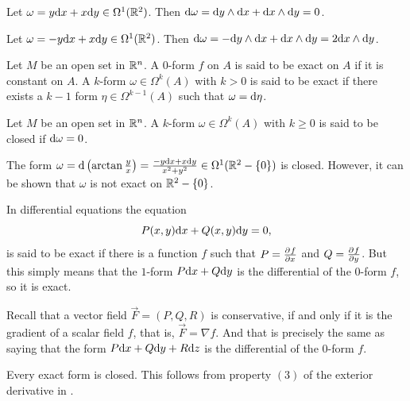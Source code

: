 \documentclass[11pt,a4paper]{article}
\begin{document}
\begin{example}
  Let $\omega = y \dx + x \dy \in \Omega^1(\R^2)$.
  Then $\dif \omega = \dy \wedge \dx + \dx \wedge \dy = 0$.
\end{example}

\begin{example}
  Let $\omega = -y \dx + x \dy \in \Omega^1(\R^2)$.
  Then $\dif \omega = -\dy \wedge \dx + \dx \wedge \dy = 2 \dx \wedge \dy$.
\end{example}

\begin{definition}
  Let $M$ be an open set in $\mathbb{R}^n$.
  A $0$-form $f$ on $A$ is said to be exact on $A$ if it is constant on $A$.
  A $k$-form $\omega \in \Omega^k(A)$ with $k > 0$
  is said to be exact if there exists a $k-1$ form $\eta \in \Omega^{k-1}(A)$
  such that $\omega = \mathrm{d} \eta$.
\end{definition}

\begin{definition}
  Let $M$ be an open set in $\mathbb{R}^n$.
  A $k$-form $\omega \in \Omega^k(A)$ with $k \geq 0$
  is said to be closed if $\mathrm{d} \omega = 0$.
\end{definition}

\begin{remark}
  The form $\omega = \dif \del{\arctan \frac{y}{x}} = \frac{-y \dx + x \dy}{x^2 + y^2} \in \Omega^1(\R^2 - \set{0})$ is closed.
  However, it can be shown that $\omega$ is not exact on $\mathbb{R}^2 - \left\{0\right\}$.
\end{remark}

\begin{example}
  In differential equations the equation
  \[
    P(x,y) \dx + Q(x,y) \dy = 0,
  \]
  is said to be exact if there is a function $f$ such that
  $P = \pd{f}{x}$ and $Q = \pd{f}{y}$.
  But this simply means that the $1$-form $P \dx + Q \dy$
  is the differential of the $0$-form $f$,
  so it is exact.
\end{example}

\begin{example}
  Recall that a vector field $\vec F = (P,Q,R)$ is conservative,
  if and only if it is the gradient of a scalar field $f$,
  that is, $\vec F = \nabla f$.
  And that is precisely the same as saying that
  the form $P \dx + Q \dy + R \dz$ is the differential of the $0$-form $f$.
\end{example}

\begin{remark}
  Every exact form is closed.
  This follows from property $(3)$ of the exterior derivative
  in .
\end{remark}
\end{document}
